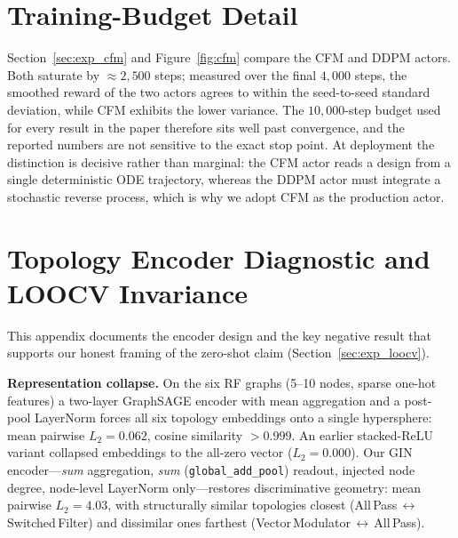 \documentclass[sigconf,anonymous,review]{acmart}
\begin{document}



\appendix

\section{Training-Budget Detail}
\label{app:cfm}

Section~\ref{sec:exp_cfm} and Figure~\ref{fig:cfm} compare the CFM and DDPM
actors.  Both saturate by ${\approx}2{,}500$ steps; measured over the final
$4{,}000$ steps, the smoothed reward of the two actors agrees to within the
seed-to-seed standard deviation, while CFM exhibits the lower variance.  The
$10{,}000$-step budget used for every result in the paper therefore sits well
past convergence, and the reported numbers are not sensitive to the exact stop
point.  At deployment the distinction is decisive rather than marginal: the CFM
actor reads a design from a single deterministic ODE trajectory, whereas the
DDPM actor must integrate a stochastic reverse process, which is why we adopt
CFM as the production actor.

\section{Topology Encoder Diagnostic and LOOCV Invariance}
\label{app:encoder}

This appendix documents the encoder design and the key negative result that
supports our honest framing of the zero-shot claim (Section~\ref{sec:exp_loocv}).

\textbf{Representation collapse.}  On the six RF graphs (5--10 nodes, sparse
one-hot features) a two-layer GraphSAGE encoder with mean aggregation and a
post-pool LayerNorm forces all six topology embeddings onto a single
hypersphere: mean pairwise $L_2 = 0.062$, cosine similarity ${>}0.999$.  An
earlier stacked-ReLU variant collapsed embeddings to the all-zero vector
($L_2 = 0.000$).  Our GIN encoder---\emph{sum} aggregation, \emph{sum}
(\texttt{global\_add\_pool}) readout, injected node degree, node-level
LayerNorm only---restores discriminative geometry: mean pairwise
$L_2 = 4.03$, with structurally similar topologies closest (All\,Pass\,$\leftrightarrow$\,Switched\,Filter)
and dissimilar ones farthest (Vector\,Modulator\,$\leftrightarrow$\,All\,Pass).
\end{document}
